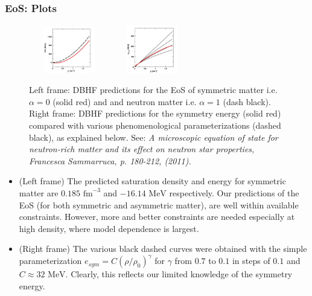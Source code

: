 \documentclass[10pt,serif]{beamer}
\newcommand{\rb}[1]{\left(#1\right)}
\begin{document}
\begin{frame}
\frametitle{EoS: Plots}
\begin{figure}[!h]
\centering
\includegraphics[width=3.5cm,height=2cm]{eos.jpg}
\includegraphics[width=3.5cm,height=2.1cm]{esym.jpg}
\caption{\scriptsize{Left frame: DBHF predictions for the EoS of symmetric matter i.e. $\alpha=0$ (solid red) and and neutron matter i.e. $\alpha = 1$ (dash black). Right frame: DBHF predictions for the symmetry energy (solid red) compared with various phenomenological parameterizations (dashed black), as explained below. See: \emph{A microscopic equation of state for neutron-rich matter and its effect on neutron star properties, Francesca Sammarruca, p. 180-212, (2011).}}}
\end{figure}
\begin{itemize}
\item \footnotesize{(Left frame) The predicted saturation density and energy for symmetric matter are $0.185 \text{ fm}^{-3}$ and $-16.14 \text{ MeV}$ respectively. Our predictions of the EoS (for both symmetric and asymmetric matter), are well within available constraints. However, more and better constraints are needed especially at high density, where model dependence is largest.}
\item \footnotesize{(Right frame) The various black dashed curves were obtained with the simple parameterization $e_{sym}=C \rb{\rho/\rho_0}^\gamma$ for $\gamma$ from $0.7$ to $0.1$ in steps of $0.1$ and $C \approx 32 \text{ MeV}$. \alert{Clearly, this reflects our limited knowledge of the symmetry energy}.}
\end{itemize}
\end{frame}
\end{document}
